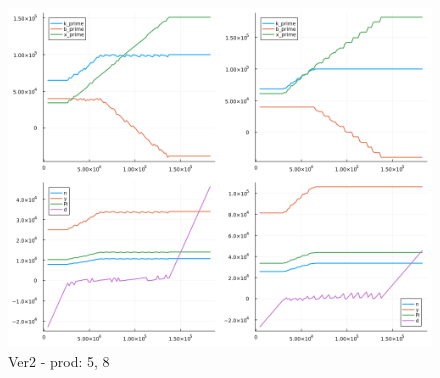 \documentclass[12pt]{article}
\begin{document}
\begin{figure}[H]  %
    \centering
    \caption{Ver2 - prod: 5, 8} \label{chart:CFLcdf}
    \includegraphics[width=1\textwidth]{ver2.png}
\end{figure}


\newpage
\setcounter{equation}{0}
\end{document}
